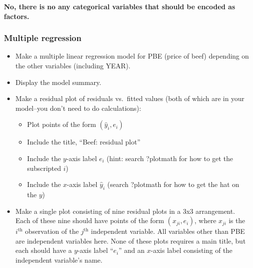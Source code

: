 \documentclass[]{article}
\newenvironment{Shaded}{\begin{snugshade}}{\end{snugshade}}
\newcommand{\KeywordTok}[1]{\textcolor[rgb]{0.13,0.29,0.53}{\textbf{#1}}}
\newcommand{\StringTok}[1]{\textcolor[rgb]{0.31,0.60,0.02}{#1}}
\newcommand{\OperatorTok}[1]{\textcolor[rgb]{0.81,0.36,0.00}{\textbf{#1}}}
\newcommand{\NormalTok}[1]{#1}
\providecommand{\tightlist}{%
  \setlength{\itemsep}{0pt}\setlength{\parskip}{0pt}}
\begin{document}
\textbf{No, there is no any categorical variables that should be encoded
as factors.}

\subsubsection{Multiple regression}\label{multiple-regression}

\begin{itemize}
\tightlist
\item
  Make a multiple linear regression model for PBE (price of beef)
  depending on the other variables (including YEAR).
\item
  Display the model summary.
\item
  Make a residual plot of residuals vs.~fitted values (both of which are
  in your model--you don't need to do calculations):

  \begin{itemize}
  \tightlist
  \item
    Plot points of the form \((\hat{y}_i, e_i)\)
  \item
    Include the title, ``Beef: residual plot''
  \item
    Include the \(y\)-axis label \(e_i\) (hint: search ?plotmath for how
    to get the subscripted \(i\))
  \item
    Include the \(x\)-axis label \(\hat{y}_i\) (search ?plotmath for how
    to get the hat on the \(y\))
  \end{itemize}
\item
  Make a single plot consisting of nine residual plots in a 3x3
  arrangement. Each of these nine should have points of the form
  \((x_{ji}, e_i)\), where \(x_{ji}\) is the \(i^{\text{th}}\)
  observation of the \(j^{\text{th}}\) independent variable. All
  variables other than PBE are independent variables here. None of these
  plots requires a main title, but each should have a \(y\)-axis label
  ``\(e_i\)'' and an \(x\)-axis label consisting of the independent
  variable's name.
\end{itemize}

\begin{Shaded}
\end{Shaded}
\end{document}

